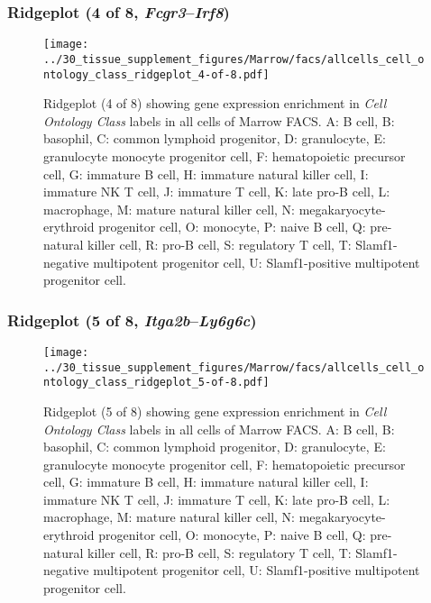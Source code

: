 \subsubsection{Ridgeplot (4 of 8, \emph{Fcgr3}--\emph{Irf8})}
\begin{figure}[h]
\centering
\texttt{[image: ../30\_tissue\_supplement\_figures/Marrow/facs/allcells\_cell\_ontology\_class\_ridgeplot\_4-of-8.pdf]}

\caption{ Ridgeplot (4 of 8)  showing gene expression enrichment in \emph{Cell Ontology Class} labels in all cells of Marrow FACS. A: B cell, B: basophil, C: common lymphoid progenitor, D: granulocyte, E: granulocyte monocyte progenitor cell, F: hematopoietic precursor cell, G: immature B cell, H: immature natural killer cell, I: immature NK T cell, J: immature T cell, K: late pro-B cell, L: macrophage, M: mature natural killer cell, N: megakaryocyte-erythroid progenitor cell, O: monocyte, P: naive B cell, Q: pre-natural killer cell, R: pro-B cell, S: regulatory T cell, T: Slamf1-negative multipotent progenitor cell, U: Slamf1-positive multipotent progenitor cell.}
\end{figure}


\clearpage

\subsubsection{Ridgeplot (5 of 8, \emph{Itga2b}--\emph{Ly6g6c})}
\begin{figure}[h]
\centering
\texttt{[image: ../30\_tissue\_supplement\_figures/Marrow/facs/allcells\_cell\_ontology\_class\_ridgeplot\_5-of-8.pdf]}

\caption{ Ridgeplot (5 of 8)  showing gene expression enrichment in \emph{Cell Ontology Class} labels in all cells of Marrow FACS. A: B cell, B: basophil, C: common lymphoid progenitor, D: granulocyte, E: granulocyte monocyte progenitor cell, F: hematopoietic precursor cell, G: immature B cell, H: immature natural killer cell, I: immature NK T cell, J: immature T cell, K: late pro-B cell, L: macrophage, M: mature natural killer cell, N: megakaryocyte-erythroid progenitor cell, O: monocyte, P: naive B cell, Q: pre-natural killer cell, R: pro-B cell, S: regulatory T cell, T: Slamf1-negative multipotent progenitor cell, U: Slamf1-positive multipotent progenitor cell.}
\end{figure}


\clearpage

